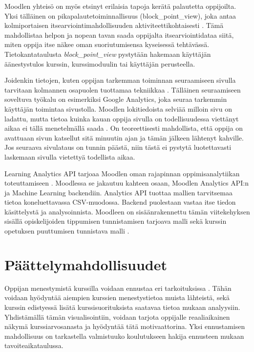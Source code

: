 Moodlen yhteisö on myös etsinyt erilaisia tapoja kerätä palautetta oppijoilta. Yksi tälläinen on pikapalautetoiminnallisuus (block\_point\_view), joka antaa kolmiportaisen itsearviointimahdollisuuden aktiviteettikohtaisesti \citep{fombaronMoodlePluginPoint2021}. Tämä mahdollistaa helpon ja nopean tavan saada oppijalta itsearviointidataa siitä, miten oppija itse näkee oman suoriutumisensa kyseisessä tehtävässä. Tietokantataulusta \emph{block\_point\_view} pystytään hakemaan käyttäjän äänestystulos kurssin, kurssimoduulin tai käyttäjän perusteella.

Joidenkin tietojen, kuten oppijan tarkemman toiminnan seuraamiseen sivulla tarvitaan kolmannen osapuolen tuottamaa tekniikkaa \citep{filvaGoogleAnalyticsTime2014}. Tälläinen seuraamiseen soveltuva työkalu on esimerkiksi Google Analytics, joka seuraa tarkemmin käyttäjän toimintaa sivustolla. Moodlen lokitiedoista selviää milloin sivu on ladattu, mutta tietoa kuinka kauan oppija sivulla on todellisuudessa viettänyt aikaa ei tällä menetelmällä saada \citep{dougiamasMoodle2022}. On teoreettisesti mahdollista, että oppija on avattuaan sivun katsellut sitä minuutin ajan ja tämän jälkeen lähtenyt kahville. Jos seuraava sivulataus on tunnin päästä, niin tästä ei pystytä luotettavasti laskemaan sivulla vietettyä todellista aikaa.

Learning Analytics API tarjoaa Moodlen oman rajapinnan oppimisanalytiikan toteuttamiseen \citep{oliveSupervisedLearningFramework2018}. Moodlessa se jakautuu kahteen osaan, Moodlen Analytics API:n ja Machine Learning backendiin. Analytics API tuottaa mallien tarvitsemaa tietoa koneluettavassa CSV-muodossa. Backend puolestaan vastaa itse tiedon käsittelystä ja analysoinnista. Moodleen on sisäänrakennettu tämän viitekehyksen sisällä opiskelijoiden tippumisen tunnistamisen tarjoava malli sekä kurssin opetuksen puuttumisen tunnistava malli \citep{monllaoAnalyticsAPIMoodleDocs2021}.

\section{Päättelymahdollisuudet}

Oppijan menestymistä kurssilla voidaan ennustaa eri tarkoituksissa \citep{barberCourseCorrectionUsing2012a}. Tähän voidaan hyödyntää aiempien kurssien menestystietoa muista lähteistä, sekä kurssin edistyessä lisätä kurssisuorituksista saatavaa tietoa mukaan analyysiin. Yhdistämällä tämän visualisointiin, voidaan tarjota oppijalle reaaliaikainen näkymä kurssiarvosanasta ja hyödyntää tätä motivaattorina. Yksi ennustamisen mahdollisuus on tarkastella valmistuuko koulutukseen hakija ennusteen mukaan tavoiteaikataulussa.

